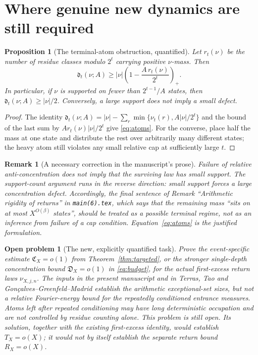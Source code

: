 \documentclass[11pt,a4paper]{article}
\newtheorem{proposition}[theorem]{Proposition}
\newtheorem{remark}[theorem]{Remark}
\newtheorem{problem}[theorem]{Open problem}
\begin{document}
\section{Where genuine new dynamics are still required}
\begin{proposition}[The terminal-atom obstruction, quantified]\label{prop:atoms}
Let $r_t(\nu)$ be the number of residue classes modulo $2^t$ carrying positive $\nu$-mass. Then
\begin{equation}\label{eq:atoms}
 \mathfrak d_t(\nu;A)\ge |\nu|\left(1-\frac{A\,r_t(\nu)}{2^t}\right)_+.
\end{equation}
In particular, if $\nu$ is supported on fewer than $2^{t-1}/A$ states, then $\mathfrak d_t(\nu;A)\ge|\nu|/2$. Conversely, a large support does not imply a small defect.
\end{proposition}
\begin{proof}
The identity
$\mathfrak d_t(\nu;A)=|\nu|-\sum_r\min\{\nu_t(r),A|\nu|/2^t\}$
and the bound of the last sum by $Ar_t(\nu)|\nu|/2^t$ give \eqref{eq:atoms}. For the converse, place half the mass at one state and distribute the rest over arbitrarily many different states; the heavy atom still violates any small relative cap at sufficiently large $t$.
\end{proof}

\begin{remark}[A necessary correction in the manuscript's prose]
Failure of relative anti-concentration does \emph{not} imply that the surviving law has small support. The support-count argument runs in the reverse direction: \emph{small support forces a large concentration defect}. Accordingly, the final sentence of Remark ``Arithmetic rigidity of returns'' in \texttt{main(6).tex}, which says that the remaining mass ``sits on at most $X^{O(\beta)}$ states'', should be treated as a possible terminal regime, not as an inference from failure of a cap condition. Equation~\eqref{eq:atoms} is the justified formulation.
\end{remark}

\begin{problem}[The new, explicitly quantified task]
Prove the \emph{event-specific} estimate $\mathfrak C_X=o(1)$ from Theorem~\ref{thm:targeted}, or the stronger single-depth concentration bound $\mathfrak D_X=o(1)$ in \eqref{eq:budget}, for the \emph{actual first-excess return laws} $\nu_{X,j,n}$. The inputs in the present manuscript and in Terras, Tao and Gon\c{c}alves--Greenfeld--Madrid establish the arithmetic exceptional-set sizes, but not a relative Fourier-energy bound for the repeatedly conditioned entrance measures. Atoms left after repeated conditioning may have long deterministic occupation and are not controlled by residue counting alone. This problem is still open. Its solution, together with the existing first-excess identity, would establish $T_X=o(X)$; it would not by itself establish the separate return bound $R_X=o(X)$.
\end{problem}
\end{document}
